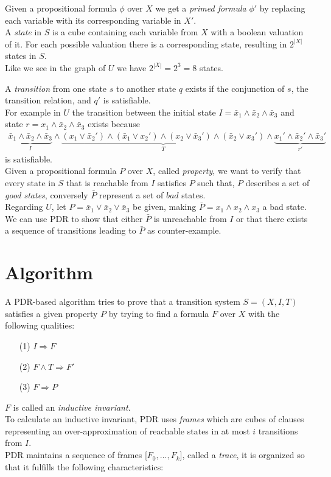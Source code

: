\documentclass[11pt, a4paper, BCOR=10mm, ngerman, oneside]{scrbook}
\begin{document}
Given a propositional formula $\phi$ over $X$ we get a \textsl{primed formula} $\phi'$ by replacing each variable with its corresponding variable in $X'$. \\

A \textsl{state} in $S$ is a cube containing each variable from $X$ with a boolean valuation of it. For each possible valuation there is a corresponding state, resulting in $2^{|X|}$ states in $S$. \\
Like we see in the graph of $U$ we have $2^{|X|} = 2^3 = 8$ states.

A \textsl{transition} from one state $s$ to another state $q$ exists if the conjunction of $s$, the transition relation, and $q'$ is satisfiable.\\ For example in $U$ the transition between the initial state $I = \bar x_1 \land \bar x_2 \land \bar x_3$ and state $r = x_1 \land \bar x_2 \land \bar x_3$ exists because
\begin{align*}
\underbrace{\bar x_1 \land \bar x_2 \land \bar x_3}_{I} \land \underbrace{(x_1 \lor \bar x_2' ) \land ( \bar x_1 \lor x_2') \land (x_2 \lor \bar x_3') \land ( \bar x_2 \lor x_3')}_T \land \underbrace{x_1' \land \bar x_2' \land \bar x_3'}_{r'}
\end{align*}
is satisfiable.\\

Given a propositional formula $P$ over $X$, called \textsl{property}, we want
to verify that every state in $S$ that is reachable from
$I$ satisfies $P$ such that, $P$ describes a set of \textsl{good states}, conversely $\bar P$ represent a set of $bad$ states.  \\ 
Regarding $U$, let $P = \bar x_1 \lor \bar x_2 \lor \bar x_3$ be given, making $\bar P = x_1 \land x_2 \land x_3$ a bad state. \\ 
We can use PDR to show that either $\bar P$ is unreachable from $I$ or that there exists a sequence of transitions leading to $\bar P$ as counter-example.

\section{Algorithm}
A PDR-based algorithm tries to prove that a transition system $S = (X, I, T)$ satisfies a given property $P$ by trying to find a formula $F$ over $X$ with the following qualities:
\begin{itemize}
\item[(1)] $I \Rightarrow F$
\item[(2)] $F \land T \Rightarrow F'$
\item[(3)] $F \Rightarrow P$
\end{itemize}
$F$ is called an \textsl{inductive invariant}. \\ 
To calculate an inductive invariant, PDR uses \textsl{frames} which are cubes of clauses representing an over-approximation of reachable states in at most $i$ transitions from $I$. \\
PDR maintains a sequence of frames [$F_0, ..., F_k$], called a \textsl{trace}, it is organized so that it fulfills the following characteristics: 
\end{document}
